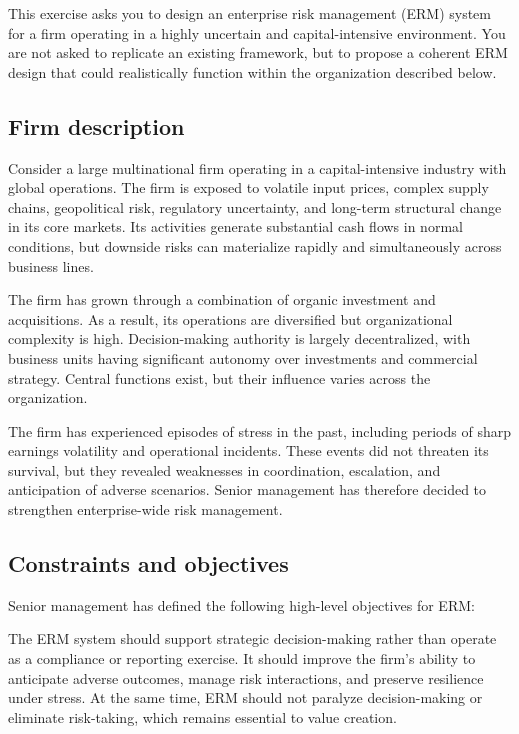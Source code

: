 \documentclass[11pt]{article}
\begin{document}
This exercise asks you to design an enterprise risk management (ERM) system
for a firm operating in a highly uncertain and capital-intensive environment.
You are not asked to replicate an existing framework, but to propose a coherent
ERM design that could realistically function within the organization described
below.

\subsection*{Firm description}

Consider a large multinational firm operating in a capital-intensive industry
with global operations. The firm is exposed to volatile input prices, complex
supply chains, geopolitical risk, regulatory uncertainty, and long-term
structural change in its core markets. Its activities generate substantial cash
flows in normal conditions, but downside risks can materialize rapidly and
simultaneously across business lines.

The firm has grown through a combination of organic investment and acquisitions.
As a result, its operations are diversified but organizational complexity is
high. Decision-making authority is largely decentralized, with business units
having significant autonomy over investments and commercial strategy. Central
functions exist, but their influence varies across the organization.

The firm has experienced episodes of stress in the past, including periods of
sharp earnings volatility and operational incidents. These events did not
threaten its survival, but they revealed weaknesses in coordination, escalation,
and anticipation of adverse scenarios. Senior management has therefore decided
to strengthen enterprise-wide risk management.

\subsection*{Constraints and objectives}

Senior management has defined the following high-level objectives for ERM:

The ERM system should support strategic decision-making rather than operate as
a compliance or reporting exercise. It should improve the firm’s ability to
anticipate adverse outcomes, manage risk interactions, and preserve resilience
under stress. At the same time, ERM should not paralyze decision-making or
eliminate risk-taking, which remains essential to value creation.
\end{document}
